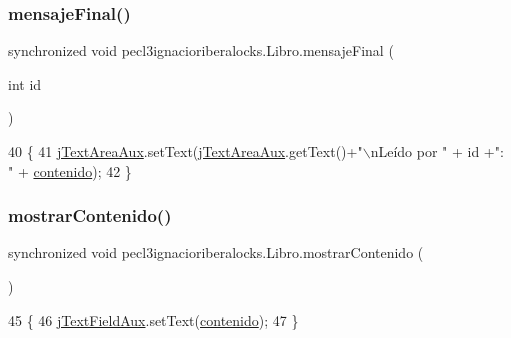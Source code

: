 \subsubsection{\texorpdfstring{mensaje\+Final()}{mensajeFinal()}}
{\footnotesize\ttfamily synchronized void pecl3ignacioriberalocks.\+Libro.\+mensaje\+Final (\begin{DoxyParamCaption}\item[{int}]{id }\end{DoxyParamCaption})\hspace{0.3cm}{\ttfamily [inline]}}


\begin{DoxyCode}
40     \{
41         \mbox{\hyperlink{classpecl3ignacioriberalocks_1_1_libro_a16681c45336d0e06fcddcbff96b7bd5d}{jTextAreaAux}}.setText(\mbox{\hyperlink{classpecl3ignacioriberalocks_1_1_libro_a16681c45336d0e06fcddcbff96b7bd5d}{jTextAreaAux}}.getText()+\textcolor{stringliteral}{"\(\backslash\)nLeído por "} + \textcolor{keywordtype}{id} +\textcolor{stringliteral}{": "} + 
      \mbox{\hyperlink{classpecl3ignacioriberalocks_1_1_libro_a5da87c57f21f55953a8b839be533260e}{contenido}});
42     \}
\end{DoxyCode}
\mbox{\label{classpecl3ignacioriberalocks_1_1_libro_aeb849a3a556d56c0b9e2fe166e9ac1a0}} 
\subsubsection{\texorpdfstring{mostrar\+Contenido()}{mostrarContenido()}}
{\footnotesize\ttfamily synchronized void pecl3ignacioriberalocks.\+Libro.\+mostrar\+Contenido (\begin{DoxyParamCaption}{ }\end{DoxyParamCaption})\hspace{0.3cm}{\ttfamily [inline]}}


\begin{DoxyCode}
45     \{
46         \mbox{\hyperlink{classpecl3ignacioriberalocks_1_1_libro_aa7207f75bf58afbf14b600038be4bc5f}{jTextFieldAux}}.setText(\mbox{\hyperlink{classpecl3ignacioriberalocks_1_1_libro_a5da87c57f21f55953a8b839be533260e}{contenido}});
47     \}
\end{DoxyCode}
\mbox{\label{classpecl3ignacioriberalocks_1_1_libro_a8f8b0a5509bb76c609107a64826bfc1f}} 
